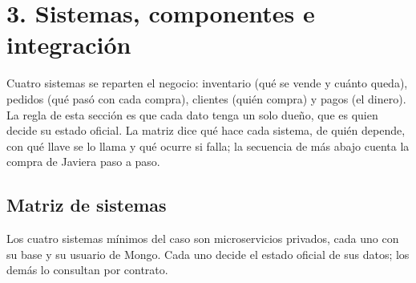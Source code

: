 
\section{3. Sistemas, componentes e integración}

\begin{landscape}
Cuatro sistemas se reparten el negocio: inventario (qué se vende y cuánto queda), pedidos (qué pasó con cada compra), clientes (quién compra) y pagos (el dinero). La regla de esta sección es que cada dato tenga un solo dueño, que es quien decide su estado oficial. La matriz dice qué hace cada sistema, de quién depende, con qué llave se lo llama y qué ocurre si falla; la secuencia de más abajo cuenta la compra de Javiera paso a paso.

\subsection{Matriz de sistemas}
Los cuatro sistemas mínimos del caso son microservicios privados, cada uno con su base y su usuario de Mongo. Cada uno decide el estado oficial de sus datos; los demás lo consultan por contrato.


\end{landscape}
